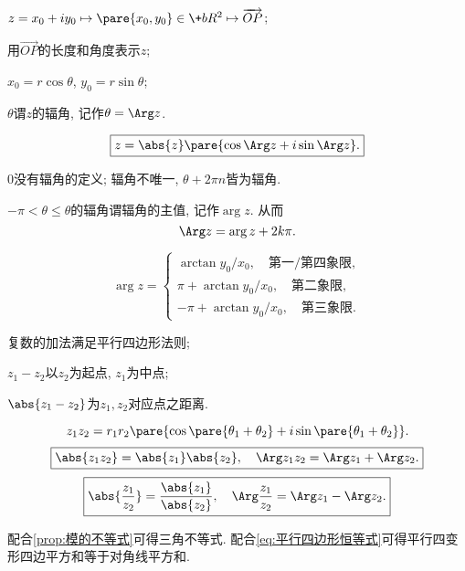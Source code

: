 \documentclass{ctexart}
\begin{document}
\begin{figure}[ht]
    \centering
\end{figure}
\begin{cenum}
    \item $z = x_0 + iy_0 \mapsto \pare{x_0,y_0}\in\+bR^2\mapsto \overrightarrow{OP}$;
    \item 用$\overrightarrow{OP}$的长度和角度表示$z$;
    \item $x_0 = r\cos\theta$, $y_0 = r\sin\theta$;
    \item $\theta$谓$z$的辐角, 记作$\theta = \Arg z$.
\end{cenum}
\[ \boxed{ z = \abs{z}\pare{\cos\Arg z + i\sin\Arg z}.} \]
\begin{remark}
    $0$没有辐角的定义; 辐角不唯一, $\theta + 2\pi n$皆为辐角.
\end{remark}
\begin{definition}
    $-\pi < \theta \le \theta$的辐角谓辐角的主值, 记作$\arg z$. 从而
    \[ \Arg z = \arg z + 2k\pi. \]
\end{definition}
\begin{lemma}
    \[ \arg z = \begin{cases}
        \arctan y_0/x_0,\quad \text{第一/第四象限},\\
        \pi + \arctan y_0/x_0,\quad \text{第二象限},\\
        -\pi + \arctan y_0/x_0,\quad \text{第三象限}.
    \end{cases} \]
\end{lemma}
\begin{figure}[ht]
    \centering
\end{figure}
\begin{figure}[ht]
    \centering
\end{figure}
\begin{cenum}
    \item 复数的加法满足平行四边形法则;
    \item $z_1-z_2$以$z_2$为起点, $z_1$为中点;
    \item $\abs{z_1-z_2}$为$z_1,z_2$对应点之距离.
\end{cenum}
\begin{theorem}
    \[ z_1z_2 = r_1r_2\pare{\cos\pare{\theta_1+\theta_2} + i\sin\pare{\theta_1+\theta_2}}. \]
    \[ \boxed{\abs{z_1z_2} = \abs{z_1}\abs{z_2},\quad \Arg z_1z_2 = \Arg z_1 + \Arg z_2.} \]
    \[ \boxed{\abs{\frac{z_1}{z_2}} = \frac{\abs{z_1}}{\abs{z_2}},\quad \Arg \frac{z_1}{z_2} = \Arg z_1 - \Arg z_2.} \]
\end{theorem}
\begin{remark}
    配合\cref{prop:模的不等式}可得三角不等式. 配合\eqref{eq:平行四边形恒等式}可得平行四变形四边平方和等于对角线平方和.
\end{remark}
\end{document}
